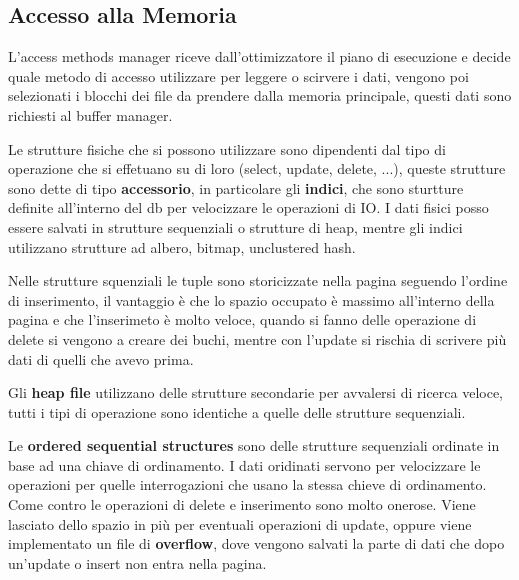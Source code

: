\documentclass[12pt]{article}
\begin{document}
\subsection{Accesso alla Memoria}
L'access methods manager riceve dall'ottimizzatore il piano di esecuzione e decide quale metodo di accesso utilizzare per leggere o scirvere i dati, vengono poi selezionati i blocchi dei file da prendere dalla memoria principale, questi dati sono richiesti al buffer manager.

Le strutture fisiche che si possono utilizzare sono dipendenti dal tipo di operazione che si effetuano su di loro (select, update, delete, ...), queste strutture sono dette di tipo \textbf{accessorio}, in particolare gli \textbf{indici}, che sono sturtture definite all'interno del db per velocizzare le operazioni di IO. I dati fisici posso essere salvati in strutture sequenziali o strutture di heap, mentre gli indici utilizzano strutture ad albero, bitmap, unclustered hash.

Nelle strutture squenziali le tuple sono storicizzate nella pagina seguendo l'ordine di inserimento, il vantaggio \`e che lo spazio occupato \`e massimo all'interno della pagina e che l'inserimeto \`e molto veloce, quando si fanno delle operazione di delete si vengono a creare dei buchi, mentre con l'update si rischia di scrivere pi\`u dati di quelli che avevo prima.

Gli \textbf{heap file} utilizzano delle strutture secondarie per avvalersi di ricerca veloce, tutti i tipi di operazione sono identiche a quelle delle strutture sequenziali.

Le \textbf{ordered sequential structures} sono delle strutture sequenziali ordinate in base ad una chiave di ordinamento. I dati oridinati servono per velocizzare le operazioni per quelle interrogazioni che usano la stessa chieve di ordinamento. Come contro le operazioni di delete e inserimento sono molto onerose. Viene lasciato dello spazio in pi\`u per eventuali operazioni di update, oppure viene implementato un file di \textbf{overflow}, dove vengono salvati la parte di dati che dopo un'update o insert non entra nella pagina.
\end{document}
